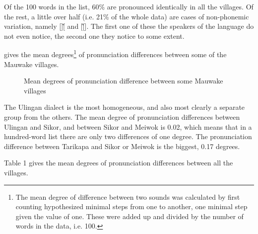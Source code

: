 Of the 100 words in the list, 60\% are pronounced identically in all the villages.  Of the rest, a little over half (i.e. 21\% of the whole data) are cases of non-phonemic variation, namely []\~[\emphs{$\beta $}\emphs{],} and [\emphs{j]}\~[\emphs{{\textyogh}}]. The first one of these the speakers of the language do not even notice, the second one they notice to some extent. 

 gives the mean degrees\footnote{The mean degree of difference between two sounds was calculated by first counting hypothesized minimal steps from one to another, one minimal step given the value of one. These were added up and divided by the number of words in the data, i.e. 100.} of pronunciation differences between some of the Mauwake villages. 


\begin{figure}
\caption{Mean degrees of pronunciation difference between some Mauwake villages}
\label{map:5:pronunciationdiff}
\end{figure}

The Ulingan dialect is the most homogeneous, and also most clearly a separate group from the others. The mean degree of pronunciation differences between Ulingan and Sikor, and between Sikor and Meiwok is 0.02, which means that in a hundred-word list there are only two differences of one degree.  The pronunciation difference between Tarikapa and Sikor or Meiwok is the biggest, 0.17 degrees.



Table 1 gives the mean degrees of pronunciation differences between all the villages.


